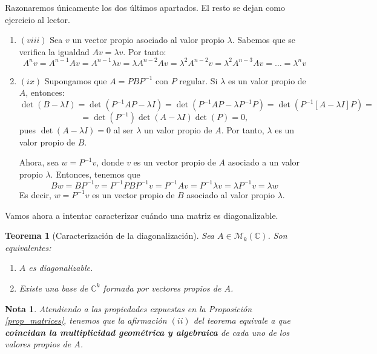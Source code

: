 \documentclass[11pt, a4paper]{article}
\makeatletter
\newif\IfInSansMode
\let\oldsf\sffamily
\renewcommand*{\sffamily}{\oldsf\mathversion{sans}\InSansModetrue}
\let\oldnorm\normalfont
\renewcommand*{\normalfont}{\oldnorm\InSansModefalse\mathversion{normal}}
\renewenvironment{proof}[1][\proofname] {\vspace{-15pt}\par\pushQED{\qed}\normalfont\topsep6\p@\@plus6\p@\relax\trivlist\item[\hskip\labelsep\it#1\@addpunct{.}]\ignorespaces}{\popQED\endtrivlist\@endpefalse}
\numberwithin{equation}{section}
\newcommand{\la}{\lambda}
\renewenvironment{proof}[1][\proofname] {\par\pushQED{\qed}\normalfont\topsep6\p@\@plus6\p@\relax\trivlist\item[\hskip\labelsep\itshape\sffamily#1\@addpunct{.}]\ignorespaces}{\popQED\endtrivlist\@endpefalse}
\theoremstyle{theorem-style}
\newtheorem{nth}{Teorema}[section]
\theoremstyle{definition-style}
\theoremstyle{remark-style}
\newtheorem*{nota}{Nota}
\theoremstyle{example-style}
\newenvironment{nlist}
{\begin{enumerate}
    \renewcommand\labelenumi{(\emph{\roman{enumi})}}}
  {\end{enumerate}}
\makeatother
\begin{document}
\begin{proof} Razonaremos únicamente los dos últimos apartados. El resto se dejan como ejercicio al lector.

\begin{nlist}

\item[$(viii)$] Sea $v$ un vector propio asociado al valor propio $\la$. Sabemos que se verifica la igualdad $Av = \la v$. Por tanto: $$A^n v = A^{n-1}Av = A^{n-1}\la v = \la A^{n-2}Av = \la^2 A^{n-2}v = \la^2 A^{n-3}Av = \dots = \la^n v$$

\item[$(ix)$] Supongamos que $A=PBP^{-1}$ con $P$ regular. Si $\lambda$ es un valor propio de $A$, entonces: $$\det(B - \la I) =  \det(P^{-1}AP - \lambda I) = \det(P^{-1}AP - \lambda P^{-1}P) = \det(P^{-1}[A - \la I]P) =$$ $$=\det(P^{-1}) \det(A - \lambda I) \det(P) = 0, $$
pues $\det(A - \la I) = 0$ al ser $\lambda$ un valor propio de $A$. Por tanto, $\lambda$ es un valor propio de $B$.

Ahora, sea $w = P^{-1}v$, donde $v$ es un vector propio de $A$ asociado a un valor propio $\la$. Entonces, tenemos que $$Bw = BP^{-1}v = P^{-1}PBP^{-1}v = P^{-1}Av = P^{-1}\la v = \la P^{-1}v = \la w$$ Es decir, $w = P^{-1}v$ es un vector propio de $B$ asociado al valor propio $\la$.
	
\end{nlist}


\end{proof}

Vamos ahora a intentar caracterizar cuándo una matriz es diagonalizable.

\begin{nth}[Caracterización de la diagonalización]
  Sea $A \in \mathcal M_k(\mathbb C)$. Son equivalentes:
  \begin{nlist}
  \item $A$ es diagonalizable.
  \item Existe una base de $\mathbb C^k$ formada por vectores propios de $A$.
  \end{nlist}
\end{nth}

\begin{nota}
	Atendiendo a las propiedades expuestas en la \textit{Proposición \ref{prop_matrices}}, tenemos que la afirmación $(ii)$ del teorema equivale a que \textbf{coincidan la multiplicidad geométrica y algebraica} de cada uno de los valores propios de $A$.
\end{nota}
\end{document}
